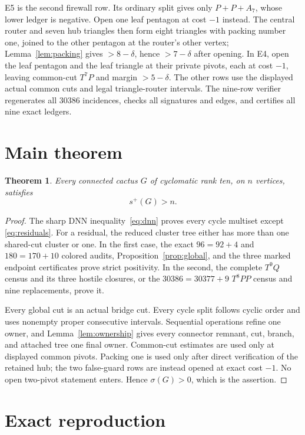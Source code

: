 \documentclass[11pt]{article}
\newtheorem{theorem}{Theorem}[section]
\newcommand{\spE}{s^+}
\newcommand{\sig}{\sigma}
\begin{document}
E5 is the second firewall row.  Its ordinary split gives only $P+P+A_7$,
whose lower ledger is negative.  Open one leaf pentagon at cost $-1$ instead.
The central router and seven hub triangles then form eight triangles with
packing number one, joined to the other pentagon at the router's other vertex;
Lemma~\ref{lem:packing} gives $>8-\delta$, hence $>7-\delta$ after opening.
In E4, open the leaf pentagon and the leaf triangle at their private pivots,
each at cost $-1$, leaving common-cut $T^7P$ and margin $>5-\delta$.
The other rows use the displayed actual common cuts and legal triangle-router
intervals.  The nine-row verifier~\cite{Nine} regenerates all 30386 incidences,
checks all signatures and edges, and certifies all nine exact ledgers.

\section{Main theorem}

\begin{theorem}\label{thm:main}
Every connected cactus $G$ of cyclomatic rank ten, on $n$ vertices, satisfies
\[
 \boxed{\spE(G)>n}.
\]
\end{theorem}

\begin{proof}
The sharp DNN inequality~\eqref{eq:dnn} proves every cycle multiset except
\eqref{eq:residuals}.  For a residual, the reduced cluster tree either has more
than one shared-cut cluster or one.  In the first case, the exact
$96=92+4$ and $180=170+10$ colored audits, Proposition~\ref{prop:global}, and
the three marked endpoint certificates prove strict positivity.  In the
second, the complete $T^9Q$ census and its three hostile closures, or the
$30386=30377+9$ $T^8PP$ census and nine replacements, prove it.

Every global cut is an actual bridge cut.  Every cycle split follows cyclic
order and uses nonempty proper consecutive intervals.  Sequential operations
refine one owner, and Lemma~\ref{lem:ownership} gives every connector remnant,
cut, branch, and attached tree one final owner.  Common-cut estimates are used
only at displayed common pivots.  Packing one is used only after direct
verification of the retained hub; the two false-guard rows are instead opened
at exact cost $-1$.  No open two-pivot statement enters.  Hence
$\sig(G)>0$, which is the assertion.
\end{proof}

\appendix
\section{Exact reproduction}\label{app:reproduction}
\end{document}
